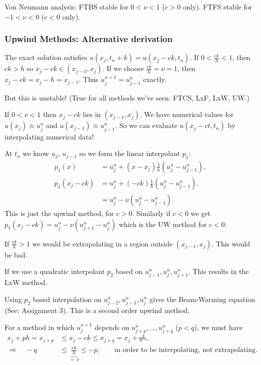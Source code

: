 \documentclass[12pt, a4paper]{article}
\theoremstyle{definition}
\theoremstyle{remark}
\numberwithin{equation}{section}
\begin{document}
Von Neumann analysis: FTBS stable for $0 < \nu < 1$ ($c>0$ only). FTFS
stable for $-1 < \nu < 0$ ($c < 0$ only).

\newpage
\subsubsection{Upwind Methods: Alternative derivation}




The exact solution satisfies $u(x_j, t_{n}+k) = u(x_j - ck, t_n)$.
If $0 < \tfrac{ck}{h} < 1$, then $ck > h$ so $x_j - ck \in (x_{j-1}, x_j)$.
If we choose $\tfrac{ck}{h} = \nu = 1$, then $x_j - ck = x_j - h = x_{j-1}$.
Thus $u_j^{n+1} = u_{j-1}^n$ exactly.

But this is unstable! (True for all methods we've seen: FTCS, LxF, LxW, UW.)

If $0 < \nu < 1$ then $x_j - ck$ lies in $(x_{j-1}, x_j)$. We have numerical
values for $u(x_j) \approx u_j^n$ and $u(x_{j-1}) \approx u_{j-1}^n$. So
we can evaluate $u(x_j-ct, t_n)$ by interpolating numerical data!

At $t_n$ we know $u_j$, $u_{j-1}$ so we form the linear interpolant $p_1$:
\begin{align*}
p_1(x) &= u_j^n + (x-x_j)\tfrac{1}{h}(u_j^n - u_{j-1}^n), \\
p_1(x_j - ck) &= u_j^n + (-ck)\tfrac{1}{h}(u_j^n - u_{j-1}^n), \\
  &= u_j^n - \nu(u_j^n - u_{j-1}^n).
\end{align*}
This is just the upwind method, for $c > 0$. Similarly if $c < 0$ we get
\mbox{$p_1(x_j - ck) = u_j^n - \nu(u_{j+1}^n - u_j^n)$} which is the UW method
for $c < 0$.

If $\tfrac{ck}{h} > 1$ we would be extrapolating in a region outside $(x_{j-1}, x_j)$.
This would be bad.

If we use a quadratic interpolant $p_2$ based on $u_{j-1}^n, u_j^n, u_{j+1}^n$. This
results in the LxW method.

Using $p_2$ based interpolation on $u_{j-2}^n, u_{j-1}^n, u_j^n$ gives the Beam-Warming equation
(See: Assignment 3). This is a second order upwind method.

For a method in which $u_j^{n+1}$ depends on $u_{j+p}^n, \ldots, u_{j+q}^n$ ($p<q$),
we must have 
\begin{align*}
x_j + ph = x_{j+p} &\le x_j - ck \le x_{j+q} = x_{j} + qh, \\
\Longrightarrow \quad -q &\le \underbrace{\tfrac{ck}{h}}_{=\ \nu} \le -p, 
\qquad \text{in order to be interpolating, not extrapolating}.
\end{align*}
\end{document}
